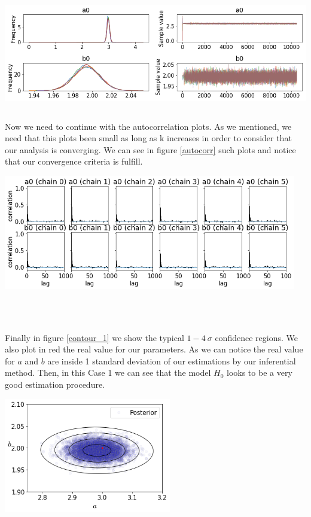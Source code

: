 \documentclass[onecolumn,           %
               showpacs,            %
               preprintnumbers,     %
               aps,                 %
               prl,          	    %
               letterpaper,             %
               superscriptaddress,      %
               nofootinbib,         %
               tightenlines,        %
               floats,floatfix      %
               ,usenatbib,
               ]{revtex4-1}
\begin{document}
\begin{minipage}{\textwidth}
\centering
\includegraphics[height=5cm]{Figures/chain_new.png}
\label{chain}
\end{minipage}

Now we need to continue with the autocorrelation plots. As we mentioned, we need that this plots been small as long as k increases in order to consider that our analysis is converging. We can see in figure \ref{autocorr} such plots and notice that our convergence criteria is fulfill.

\begin{minipage}{\textwidth}
\centering
\includegraphics[height=5cm]{Figures/autocorr_1.png}
\label{autocorr}
\end{minipage}
\\$ $

Finally in figure \ref{contour_1} we show the typical $1-4\ \sigma$ confidence regions. We also plot in red the real value for our parameters. As we can notice the real value for $a$ and $b$ are inside 1 standard deviation of our estimations by our inferential method. Then, in this Case 1 we can see that the model $H_0$ looks to be a very good estimation procedure.

\begin{minipage}{\textwidth}
\centering
\includegraphics[height=5cm]{Figures/contour_1.png}
\label{contour_1}
\end{minipage}\\ $ $
\end{document}
